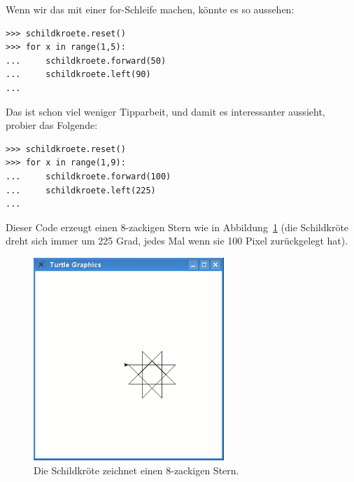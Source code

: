 \noindent
Wenn wir das mit einer for-Schleife machen, könnte es so aussehen:

\begin{Verbatim}[frame=single]
>>> schildkroete.reset()
>>> for x in range(1,5):
...     schildkroete.forward(50)
...     schildkroete.left(90)
...
\end{Verbatim}

Das ist schon viel weniger Tipparbeit, und damit es interessanter aussieht, probier das Folgende:

\begin{Verbatim}[frame=single]
>>> schildkroete.reset()
>>> for x in range(1,9):
...     schildkroete.forward(100)
...     schildkroete.left(225)
...
\end{Verbatim}

Dieser Code erzeugt einen 8-zackigen Stern wie in Abbildung~\ref{fig20} (die Schildkröte dreht sich immer um 225 Grad, jedes Mal wenn sie 100 Pixel zurückgelegt hat).

\begin{figure}
\begin{center}
\includegraphics[width=72mm]{images/figure20}
\end{center}
\caption{Die Schildkröte zeichnet einen 8-zackigen Stern.}\label{fig20}
\end{figure}

